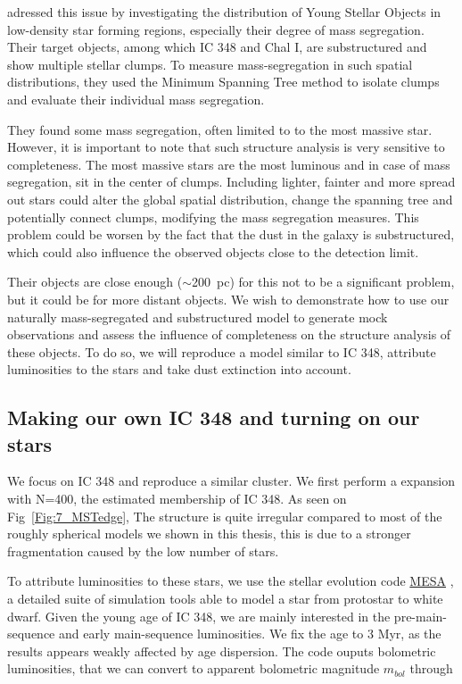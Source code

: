\cite{Kirk2011} adressed this issue by investigating the distribution of Young Stellar Objects in low-density star forming regions, especially their degree of mass segregation. Their target objects, among which IC 348 and Chal I, are substructured and show multiple stellar clumps. To measure mass-segregation in such spatial distributions, they used the Minimum Spanning Tree method to isolate clumps and evaluate their individual mass segregation.

They found some mass segregation, often limited to to the most massive star. However, it is important to note that such structure analysis is very  sensitive to completeness. The most massive stars are the most luminous and in case of mass segregation, sit in the center of clumps. Including lighter, fainter and more spread out stars could alter the global spatial distribution, change the spanning tree and potentially connect clumps, modifying the mass segregation measures. This problem could be worsen by the fact that the dust in the galaxy is substructured, which could also influence the observed objects close to the detection limit.

Their objects are close enough ($\sim$200~pc) for this not to be a significant problem, but it could be for more distant objects. We wish to  demonstrate how to use our naturally mass-segregated and substructured model to generate mock observations and assess the influence of completeness on the structure analysis of these objects. To do so, we will reproduce a model similar to IC 348, attribute luminosities to the stars and take dust extinction into account.


\subsection*{Making our own IC 348 and turning on our stars}


We focus on IC 348 and reproduce a similar cluster. We first perform a \HubLem expansion with N=400, the estimated membership of IC 348. As seen on Fig~\ref{Fig:7_MSTedge}, The structure is quite irregular compared to most of the roughly spherical models we shown in this thesis, this is due to a stronger fragmentation caused by the low number of stars.

To attribute luminosities to these stars, we use the stellar evolution code \href{http://mesa.sourceforge.net/}{MESA} \citep{Paxton2011}, a detailed suite of simulation tools able to model a star from protostar to white dwarf. Given the young age of IC 348, we are mainly interested in the pre-main-sequence and early main-sequence luminosities. We fix the age to 3 Myr, as the results appears weakly affected by age dispersion. The code ouputs bolometric luminosities, that we can convert to apparent bolometric magnitude $m_{bol}$ through

